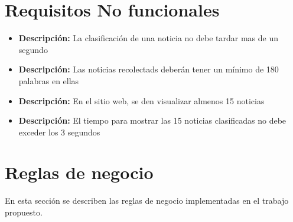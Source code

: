 
\section{Requisitos No funcionales}

    \begin{itemize}
      \item \textbf{Descripción:} La clasificación de una noticia no debe tardar mas de un segundo\\
    \end{itemize}

    \begin{itemize}
     \item \textbf{Descripción:} Las noticias recolectads deberán tener un mínimo de 180 palabras en ellas\\
    \end{itemize}

    \begin{itemize}
      \item \textbf{Descripción:} En el sitio web, se den visualizar almenos 15 noticias\\
    \end{itemize}

    \begin{itemize}
      \item \textbf{Descripción:} El tiempo para mostrar las 15 noticias clasificadas no debe exceder los 3 segundos\\
    \end{itemize}



\section{Reglas de negocio}
  
  En esta sección se describen las reglas de negocio implementadas en el trabajo propuesto.\\\\


